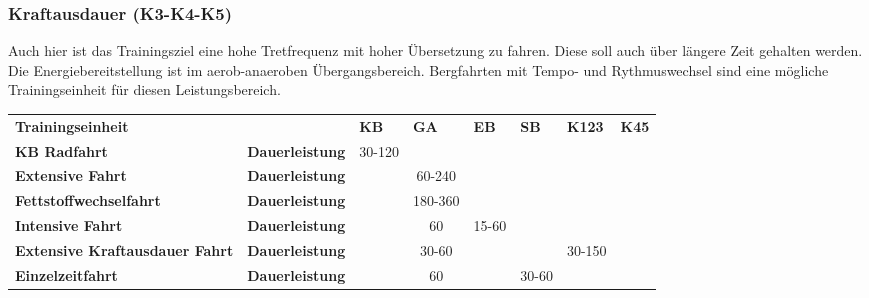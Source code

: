 \subsubsection{Kraftausdauer (K3-K4-K5)}
Auch hier ist das Trainingsziel eine hohe Tretfrequenz mit hoher Übersetzung zu fahren. Diese soll auch über längere Zeit gehalten werden. Die Energiebereitstellung ist im aerob-anaeroben Übergangsbereich. Bergfahrten mit Tempo- und Rythmuswechsel sind eine mögliche Trainingseinheit für diesen Leistungsbereich.

\begin{table}[]
\begin{tabular}{lllcllll}
\textbf{Trainingseinheit}                         &                        & \textbf{KB}                & \multicolumn{1}{l}{\textbf{GA}} & \textbf{EB}                              & \textbf{SB}                         & \textbf{K123}              & \textbf{K45}               \\
\textbf{KB Radfahrt}                          & \textbf{Dauerleistung} & \multicolumn{1}{c}{30-120} & \multicolumn{1}{l}{}            &                                          &                                     &                            &                            \\
\textbf{Extensive Fahrt}                      & \textbf{Dauerleistung} &                            & 60-240                          &                                          &                                     &                            &                            \\
\textbf{Fettstoffwechselfahrt}                & \textbf{Dauerleistung} &                            & 180-360                         &                                          &                                     &                            &                            \\
\textbf{Intensive Fahrt}                      & \textbf{Dauerleistung} &                            & 60                              & \multicolumn{1}{c}{15-60}                &                                     &                            &                            \\
\textbf{Extensive Kraftausdauer Fahrt}        & \textbf{Dauerleistung} &                            & 30-60                           &                                          &                                     & \multicolumn{1}{c}{30-150} &                            \\
\textbf{Einzelzeitfahrt}                      & \textbf{Dauerleistung} &                            & 60                              &                                          & \multicolumn{1}{c}{30-60}           &                            &                            \\

\end{tabular}
\end{table}
